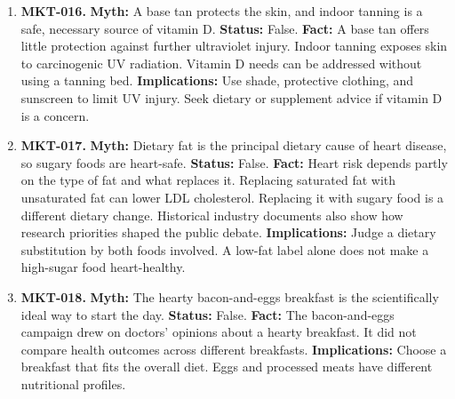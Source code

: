 \documentclass[11pt,oneside]{book}
\begin{document}
\begin{enumerate}[leftmargin=0pt,labelwidth=0pt,labelsep=0pt,itemindent=0pt]
\textbf{Status:} False.\newline
\textbf{Fact:} Burning tobacco produces harmful substances even when no additives are used. A claim about ingredients does not establish a reduction in the risk of cancer, heart disease, or lung disease. \cite{ref103,ref101}\newline
\textbf{Implications:} Treat natural and additive-free as descriptions of marketing or formulation, not as evidence of safety.
\item[] \textbf{MKT-016.} \textbf{Myth:} A base tan protects the skin, and indoor tanning is a safe, necessary source of vitamin D.\newline
\textbf{Status:} False.\newline
\textbf{Fact:} A base tan offers little protection against further ultraviolet injury. Indoor tanning exposes skin to carcinogenic UV radiation. Vitamin D needs can be addressed without using a tanning bed. \cite{ref104,ref105}\newline
\textbf{Implications:} Use shade, protective clothing, and sunscreen to limit UV injury. Seek dietary or supplement advice if vitamin D is a concern.
\item[] \textbf{MKT-017.} \textbf{Myth:} Dietary fat is the principal dietary cause of heart disease, so sugary foods are heart-safe.\newline
\textbf{Status:} False.\newline
\textbf{Fact:} Heart risk depends partly on the type of fat and what replaces it. Replacing saturated fat with unsaturated fat can lower LDL cholesterol. Replacing it with sugary food is a different dietary change. Historical industry documents also show how research priorities shaped the public debate. \cite{ref10,ref107,ref375}\newline
\textbf{Implications:} Judge a dietary substitution by both foods involved. A low-fat label alone does not make a high-sugar food heart-healthy.
\item[] \textbf{MKT-018.} \textbf{Myth:} The hearty bacon-and-eggs breakfast is the scientifically ideal way to start the day.\newline
\textbf{Status:} False.\newline
\textbf{Fact:} The bacon-and-eggs campaign drew on doctors' opinions about a hearty breakfast. It did not compare health outcomes across different breakfasts. \cite{ref108,ref375}\newline
\textbf{Implications:} Choose a breakfast that fits the overall diet. Eggs and processed meats have different nutritional profiles.

\end{enumerate}
\end{document}
